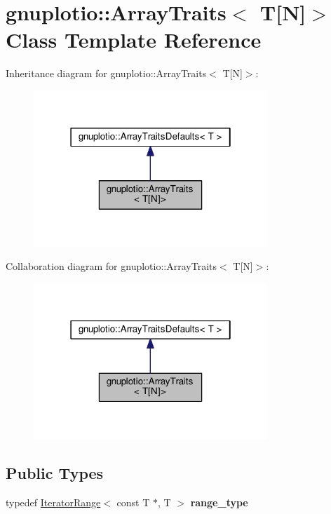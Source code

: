 \hypertarget{classgnuplotio_1_1_array_traits_3_01_t[_n]_4}{}\section{gnuplotio\+:\+:Array\+Traits$<$ T\mbox{[}N\mbox{]}$>$ Class Template Reference}
\label{classgnuplotio_1_1_array_traits_3_01_t[_n]_4}


Inheritance diagram for gnuplotio\+:\+:Array\+Traits$<$ T\mbox{[}N\mbox{]}$>$\+:\nopagebreak
\begin{figure}[H]
\begin{center}
\leavevmode
\includegraphics[width=250pt]{classgnuplotio_1_1_array_traits_3_01_t[_n]_4__inherit__graph}
\end{center}
\end{figure}


Collaboration diagram for gnuplotio\+:\+:Array\+Traits$<$ T\mbox{[}N\mbox{]}$>$\+:\nopagebreak
\begin{figure}[H]
\begin{center}
\leavevmode
\includegraphics[width=250pt]{classgnuplotio_1_1_array_traits_3_01_t[_n]_4__coll__graph}
\end{center}
\end{figure}
\subsection*{Public Types}
\begin{DoxyCompactItemize}
\item 
typedef \hyperlink{classgnuplotio_1_1_iterator_range}{Iterator\+Range}$<$ const T $\ast$, T $>$ {\bfseries range\+\_\+type}\hypertarget{classgnuplotio_1_1_array_traits_3_01_t[_n]_4_a926f3c3d14fbe82aab7b70ccc16d20fb}{}\label{classgnuplotio_1_1_array_traits_3_01_t[_n]_4_a926f3c3d14fbe82aab7b70ccc16d20fb}

\end{DoxyCompactItemize}
